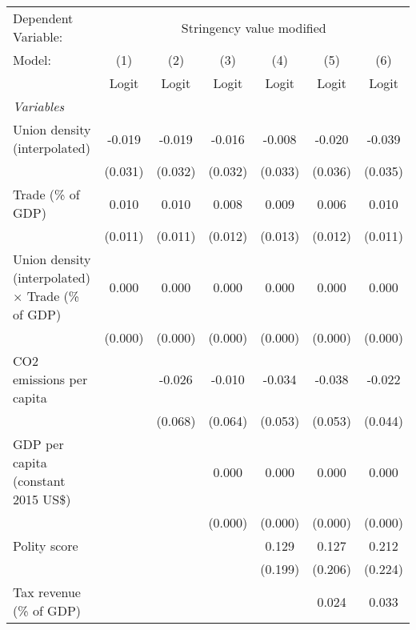 
\begingroup
\centering
\begin{tabular}{lcccccc}
   \toprule
   Dependent Variable: & \multicolumn{6}{c}{Stringency value modified}\\
   Model:                                                    & (1)     & (2)     & (3)     & (4)     & (5)     & (6)\\  
                                                             &  Logit  & Logit   & Logit   & Logit   & Logit   & Logit\\  
   \midrule
   \emph{Variables}\\
   Union density (interpolated)                              & -0.019  & -0.019  & -0.016  & -0.008  & -0.020  & -0.039\\   
                                                             & (0.031) & (0.032) & (0.032) & (0.033) & (0.036) & (0.035)\\   
   Trade (\% of GDP)                                         & 0.010   & 0.010   & 0.008   & 0.009   & 0.006   & 0.010\\   
                                                             & (0.011) & (0.011) & (0.012) & (0.013) & (0.012) & (0.011)\\   
   Union density (interpolated) $\times$ Trade (\% of GDP)   & 0.000   & 0.000   & 0.000   & 0.000   & 0.000   & 0.000\\   
                                                             & (0.000) & (0.000) & (0.000) & (0.000) & (0.000) & (0.000)\\   
   CO2 emissions per capita                                  &         & -0.026  & -0.010  & -0.034  & -0.038  & -0.022\\   
                                                             &         & (0.068) & (0.064) & (0.053) & (0.053) & (0.044)\\   
   GDP per capita (constant 2015 US\$)                       &         &         & 0.000   & 0.000   & 0.000   & 0.000\\   
                                                             &         &         & (0.000) & (0.000) & (0.000) & (0.000)\\   
   Polity score                                              &         &         &         & 0.129   & 0.127   & 0.212\\   
                                                             &         &         &         & (0.199) & (0.206) & (0.224)\\   
   Tax revenue (\% of GDP)                                   &         &         &         &         & 0.024   & 0.033\\   

\end{tabular}
